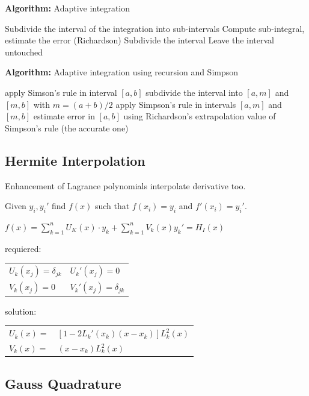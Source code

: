\documentclass[8pt,a4paper]{scrartcl}
\begin{document}
\begin{multicols*}{3}
\textbf{Algorithm:} Adaptive integration\\
\begin{algorithmic}
\State Subdivide the interval of the integration into sub-intervals
\State Compute sub-integral, estimate the error (Richardson)
\State Subdivide the interval
\Else
\State Leave the interval untouched
\EndIf
\EndFor
\end{algorithmic}
\noindent
\textbf{Algorithm:} Adaptive integration using recursion and Simpson\\
\begin{algorithmic}
\State apply Simson's rule in interval $[a,b]$
\State subdivide the interval into $[a,m]$ and $[m,b]$ with $m = (a+b)/2$
\State apply Simpson's rule in intervals $[a,m]$ and $[m,b]$
\State estimate error in $[a,b]$ using Richardson's extrapolation 
\State{} 
\Else
\State\Return value of Simpson's rule (the accurate one)
\EndIf
\EndFunction
\end{algorithmic}

\subsection{Hermite Interpolation}

Enhancement of Lagrance polynomials \dahe interpolate derivative too.

Given $y_i,y_i'$ find $f(x)$ such that $f(x_i)=y_i$ and $f'(x_i)=y_i'$.

$f(x)=\sum\limits_{k=1}^nU_K(x)\cdot y_k+\sum\limits_{k=1}^nV_k(x)y_k'=H_I(x)$

requiered: \begin{tabular}{l@{$\quad$}l}$U_k(x_j)=\delta_{jk}$&$U_k'(x_j)=0$\\$V_k(x_j)=0$&$V_k'(x_j)=\delta_{jk}$\end{tabular}

solution: \begin{tabular}{ll}$U_k(x)=$&$[1-2L_k'(x_k)(x-x_k)]L_k^2(x)$\\$V_k(x)=$&$(x-x_k)L_k^2(x)$\end{tabular}

\subsection{Gauss Quadrature}


\end{multicols*}
\end{document}
